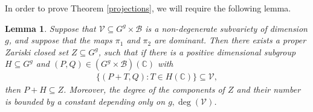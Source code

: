 \documentclass[12pt, reqno]{amsart}
\newcommand{\C}{\mathbb{C}}
\newtheorem{lem}[theorem]{Lemma}
\theoremstyle{remark}
\theoremstyle{definition}
\numberwithin{equation}{section}
\begin{document}
In order to prove Theorem \ref{projections}, we will require the following lemma.

\begin{lem} 
\label{cosets}
Suppose that $\mathcal{V} \subseteq G^g \times \mathcal{B}$ is a non-degenerate subvariety of dimension $g$, and suppose that the maps $\pi_1$ and $\pi_2$ are dominant. Then there exists a proper Zariski closed set $Z \subseteq G^g$, such that if there is a positive dimensional subgroup $H \subseteq G^g$ and $(P,Q) \in (G^g \times \mathcal{B})(\C)$ with 
\begin{align}\label{cosets} 
    \{(P + T, Q) : T \in H(\C) \} \subseteq \mathcal{V},
\end{align}
then $P + H \subseteq Z$. Moreover, the degree of the components of $Z$ and their number is bounded by a constant depending only on $g, \deg(\mathcal{V})$.


\end{lem}
\end{document}
